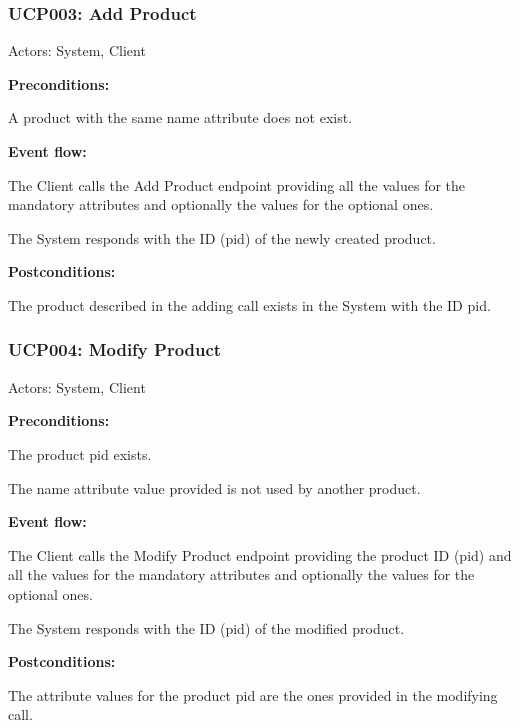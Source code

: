 \begin{ucbox}{\subsubsection{UCP003: Add Product}}
\label{UCP003}

Actors: System, Client

\textbf{Preconditions:} 

\ucitem A product with the same name attribute does not exist.

\textbf{Event flow:}

\ucitem The Client calls the Add Product endpoint providing all the values for the mandatory attributes and optionally the values for the optional ones.

\ucitem The System responds with the ID (pid) of the newly created product.

\textbf{Postconditions:}

\ucitem The product described in the adding call exists in the System with the ID pid.

\end{ucbox}

\begin{ucbox}{\subsubsection{UCP004: Modify Product}}
\label{UCP004}

Actors: System, Client

\textbf{Preconditions:}

\ucitem The product pid exists.

\ucitem The name attribute value provided is not used by another product.

\textbf{Event flow:}

\ucitem The Client calls the Modify Product endpoint providing the product ID (pid) and all the values for the mandatory attributes and optionally the values for the optional ones.

\ucitem The System responds with the ID (pid) of the modified product.

\textbf{Postconditions:}

\ucitem The attribute values for the product pid are the ones provided in the modifying call.

\end{ucbox}

